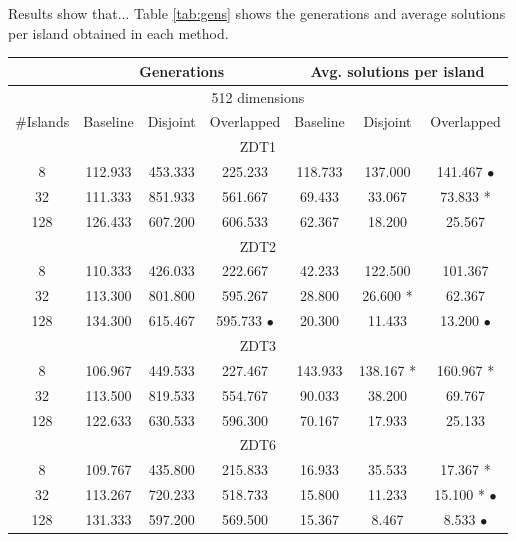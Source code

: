 \documentclass[runningheads,a4paper]{llncs}
\begin{document}
Results show that... Table \ref{tab:gens} shows the generations and average solutions per island obtained in each method. 

\begin{table}
\begin{tabular}{|c||c|c|c||c|c|c||}
\hline
	&	\multicolumn{3}{|c|}{Generations}								&	\multicolumn{3}{|c|}{Avg. solutions per island}								\\ \hline
\multicolumn{7}{|c|}{512 dimensions}																			\\ \hline
\#Islands	&	Baseline	&	Disjoint	&		Overlapped			&	Baseline	&	Disjoint		&	Overlapped			\\ \hline
\multicolumn{7}{|c|}{ZDT1}																			\\ \hline
8	&	112.933	&	453.333		&	225.233			&	118.733	&	137.000		&	141.467		$\bullet$	\\
32	&	111.333	&	851.933		&	561.667			&	69.433	&	33.067		&	73.833	*		\\
128	&	126.433	&	607.200		&	606.533			&	62.367	&	18.200		&	25.567			\\ \hline
\multicolumn{7}{|c|}{ZDT2}																			\\ \hline
8	&	110.333	&	426.033		&	222.667			&	42.233	&	122.500		&	101.367			\\
32	&	113.300	&	801.800		&	595.267			&	28.800	&	26.600	*	&	62.367			\\
128	&	134.300	&	615.467		&	595.733		$\bullet$	&	20.300	&	11.433		&	13.200		$\bullet$	\\ \hline
\multicolumn{7}{|c|}{ZDT3}																			\\ \hline
8	&	106.967	&	449.533		&	227.467			&	143.933	&	138.167	*	&	160.967	*		\\
32	&	113.500	&	819.533		&	554.767			&	90.033	&	38.200		&	69.767			\\
128	&	122.633	&	630.533		&	596.300			&	70.167	&	17.933		&	25.133			\\ \hline
\multicolumn{7}{|c|}{ZDT6}																			\\ \hline
8	&	109.767	&	435.800		&	215.833			&	16.933	&	35.533		&	17.367	*		\\
32	&	113.267	&	720.233		&	518.733			&	15.800	&	11.233		&	15.100	*	$\bullet$	\\
128	&	131.333	&	597.200		&	569.500			&	15.367	&	8.467		&	8.533	 	$\bullet$	\\ \hline
																			
																			
																			

\end{tabular}
\end{table}
\end{document}
